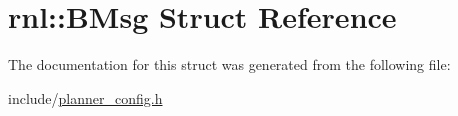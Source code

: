 \hypertarget{structrnl_1_1BMsg}{}\section{rnl\+:\+:B\+Msg Struct Reference}
\label{structrnl_1_1BMsg}


The documentation for this struct was generated from the following file\+:\begin{DoxyCompactItemize}
\item 
include/\hyperlink{planner__config_8h}{planner\+\_\+config.\+h}\end{DoxyCompactItemize}

